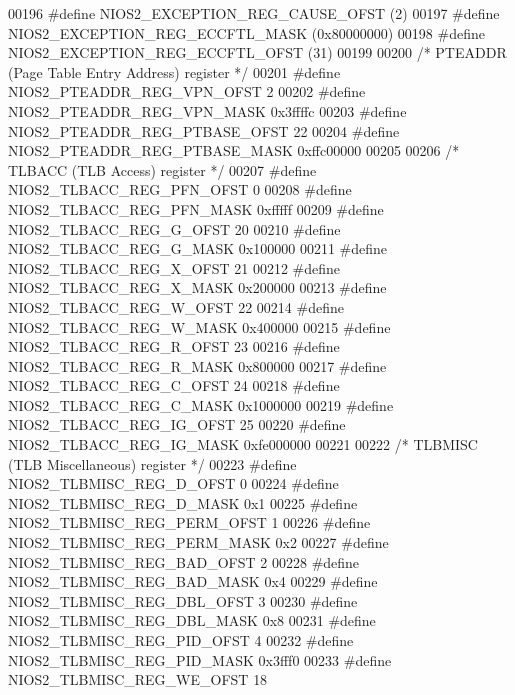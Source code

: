 \begin{DoxyCode}
{{{00196 \textcolor{preprocessor}{#define NIOS2\_EXCEPTION\_REG\_CAUSE\_OFST (2)}
00197 \textcolor{preprocessor}{#define NIOS2\_EXCEPTION\_REG\_ECCFTL\_MASK (0x80000000)}
00198 \textcolor{preprocessor}{#define NIOS2\_EXCEPTION\_REG\_ECCFTL\_OFST (31)}
00199 
00200 \textcolor{comment}{/* PTEADDR (Page Table Entry Address) register */}
00201 \textcolor{preprocessor}{#define NIOS2\_PTEADDR\_REG\_VPN\_OFST 2}
00202 \textcolor{preprocessor}{#define NIOS2\_PTEADDR\_REG\_VPN\_MASK 0x3ffffc}
00203 \textcolor{preprocessor}{#define NIOS2\_PTEADDR\_REG\_PTBASE\_OFST 22}
00204 \textcolor{preprocessor}{#define NIOS2\_PTEADDR\_REG\_PTBASE\_MASK 0xffc00000}
00205 
00206 \textcolor{comment}{/* TLBACC (TLB Access) register */}
00207 \textcolor{preprocessor}{#define NIOS2\_TLBACC\_REG\_PFN\_OFST 0}
00208 \textcolor{preprocessor}{#define NIOS2\_TLBACC\_REG\_PFN\_MASK 0xfffff}
00209 \textcolor{preprocessor}{#define NIOS2\_TLBACC\_REG\_G\_OFST 20}
00210 \textcolor{preprocessor}{#define NIOS2\_TLBACC\_REG\_G\_MASK 0x100000}
00211 \textcolor{preprocessor}{#define NIOS2\_TLBACC\_REG\_X\_OFST 21}
00212 \textcolor{preprocessor}{#define NIOS2\_TLBACC\_REG\_X\_MASK 0x200000}
00213 \textcolor{preprocessor}{#define NIOS2\_TLBACC\_REG\_W\_OFST 22}
00214 \textcolor{preprocessor}{#define NIOS2\_TLBACC\_REG\_W\_MASK 0x400000}
00215 \textcolor{preprocessor}{#define NIOS2\_TLBACC\_REG\_R\_OFST 23}
00216 \textcolor{preprocessor}{#define NIOS2\_TLBACC\_REG\_R\_MASK 0x800000}
00217 \textcolor{preprocessor}{#define NIOS2\_TLBACC\_REG\_C\_OFST 24}
00218 \textcolor{preprocessor}{#define NIOS2\_TLBACC\_REG\_C\_MASK 0x1000000}
00219 \textcolor{preprocessor}{#define NIOS2\_TLBACC\_REG\_IG\_OFST 25}
00220 \textcolor{preprocessor}{#define NIOS2\_TLBACC\_REG\_IG\_MASK 0xfe000000}
00221 
00222 \textcolor{comment}{/* TLBMISC (TLB Miscellaneous) register */}
00223 \textcolor{preprocessor}{#define NIOS2\_TLBMISC\_REG\_D\_OFST 0}
00224 \textcolor{preprocessor}{#define NIOS2\_TLBMISC\_REG\_D\_MASK 0x1}
00225 \textcolor{preprocessor}{#define NIOS2\_TLBMISC\_REG\_PERM\_OFST 1}
00226 \textcolor{preprocessor}{#define NIOS2\_TLBMISC\_REG\_PERM\_MASK 0x2}
00227 \textcolor{preprocessor}{#define NIOS2\_TLBMISC\_REG\_BAD\_OFST 2}
00228 \textcolor{preprocessor}{#define NIOS2\_TLBMISC\_REG\_BAD\_MASK 0x4}
00229 \textcolor{preprocessor}{#define NIOS2\_TLBMISC\_REG\_DBL\_OFST 3}
00230 \textcolor{preprocessor}{#define NIOS2\_TLBMISC\_REG\_DBL\_MASK 0x8}
00231 \textcolor{preprocessor}{#define NIOS2\_TLBMISC\_REG\_PID\_OFST 4}
00232 \textcolor{preprocessor}{#define NIOS2\_TLBMISC\_REG\_PID\_MASK 0x3fff0}
00233 \textcolor{preprocessor}{#define NIOS2\_TLBMISC\_REG\_WE\_OFST 18}
}}}
\end{DoxyCode}
